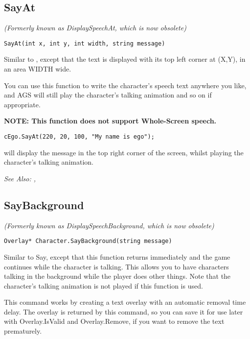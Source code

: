 \subsection{SayAt}\label{Character.SayAt}%

\it{(Formerly known as DisplaySpeechAt, which is now obsolete)}

\begin{verbatim}
SayAt(int x, int y, int width, string message)
\end{verbatim}
Similar to , except that the text is displayed with its top
left corner at (X,Y), in an area WIDTH wide.

You can use this function to write the character's speech text anywhere you like, and
AGS will still play the character's talking animation and so on if appropriate.

\bf{NOTE:} This function does not support Whole-Screen speech.

\begin{verbatim}
cEgo.SayAt(220, 20, 100, "My name is ego");
\end{verbatim}
will display the message in the top right corner of the screen, whilst playing the
character's talking animation.

\it{See Also:} ,


\subsection{SayBackground}\label{Character.SayBackground}%

\it{(Formerly known as DisplaySpeechBackground, which is now obsolete)}

\begin{verbatim}
Overlay* Character.SayBackground(string message)
\end{verbatim}
Similar to Say, except that this function returns immediately
and the game continues while the character is talking. This allows you
to have characters talking in the background while the player does other
things. Note that the character's talking animation is not played if this
function is used.

This command works by creating a text overlay with an automatic removal time
delay. The overlay is returned by this command, so you can save it for
use later with Overlay.IsValid and Overlay.Remove, if you want to remove the
text prematurely.

